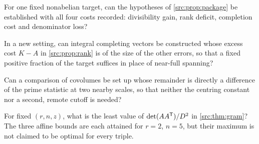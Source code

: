 \begin{question}\label{src:q:package}
For one fixed nonabelian target, can the hypotheses of \cref{src:prop:package} be established
with all four costs recorded: divisibility gain, rank deficit, completion cost and denominator
loss?
\end{question}

\begin{question}\label{src:q:completion}
In a new setting, can integral completing vectors be constructed whose excess cost $K-A$ in
\cref{src:prop:rank} is of the size of the other errors, so that a fixed positive fraction of
the target suffices in place of near-full spanning?
\end{question}

\begin{question}\label{src:q:constantfree}
Can a comparison of covolumes be set up whose remainder is directly a difference of the prime
statistic at two nearby scales, so that neither the centring constant nor a second, remote
cutoff is needed?
\end{question}

\begin{question}\label{src:q:gram}
For fixed $(r,n,z)$, what is the least value of $\det(AA^{\mathsf{T}})/D^2$ in
\cref{src:thm:gram}? The three affine bounds are each attained for $r=2$, $n=5$, but their
maximum is not claimed to be optimal for every triple.
\end{question}
\endgroup

